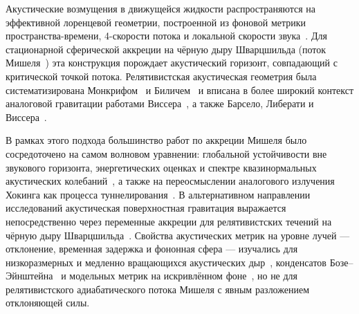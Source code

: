 \documentclass[12pt,a4paper,preprint]{elsarticle}
\begin{document}
        Акустические возмущения в движущейся жидкости распространяются на эффективной лоренцевой геометрии, построенной из фоновой метрики пространства-времени, 4-скорости потока и локальной скорости звука~\cite{UnruhWG_ExperimentalBlackHoleEvaporation_1981, VisserM_AcousticBlackHolesHorizonsErgospheresAndHawkingRadiation_1998, BarceloC_LiberatiS_VisserM_AnalogueGravity_2011}. Для стационарной сферической аккреции на чёрную дыру Шварцшильда (поток Мишеля~\cite{MichelFC_AccretionOfMatterByCondensedObjects_1972}) эта конструкция порождает акустический горизонт, совпадающий с критической точкой потока. Релятивистская акустическая геометрия была систематизирована Монкрифом~\cite{MoncriefV_StabilityOfStationarySphericalAccretionOntoASchwarzschildBlackHole_1980} и Биличем~\cite{BilicN_RelativisticAcousticGeometry_1999} и вписана в более широкий контекст аналоговой гравитации работами Виссера~\cite{VisserM_AcousticBlackHolesHorizonsErgospheresAndHawkingRadiation_1998}, а также Барсело, Либерати и Виссера~\cite{BarceloC_LiberatiS_VisserM_AnalogueGravity_2011}.
        
        В рамках этого подхода большинство работ по аккреции Мишеля было сосредоточено на самом волновом уравнении: глобальной устойчивости вне звукового горизонта, энергетических оценках и спектре квазинормальных акустических колебаний~\cite{MoncriefV_StabilityOfStationarySphericalAccretionOntoASchwarzschildBlackHole_1980, ChaverraE_MoralesMD_SarbachO_QuasinormalAcousticOscillationsInTheMichelFlow_2015}, а также на переосмыслении аналогового излучения Хокинга как процесса туннелирования~\cite{JangidN_RayAK_AcousticHawkingRadiationAsATunnellingEffectInMichelAccretion_2026}. В альтернативном направлении исследований акустическая поверхностная гравитация выражается непосредственно через переменные аккреции для релятивистских течений на чёрную дыру Шварцшильда~\cite{DasTK_BilicN_DasguptaS_BlackHoleAccretionDiscAsAnAnalogueGravityModel_2007, TarafdarP_DasTK_GeometricConfigurationOfMatterForAxiallySymmetricBackgroundFlowsInTheSchwarzschildMetric_2013, ShaikhMA_FirdousiI_DasTK_RelativisticSonicGeometryForIsothermalAccretionInTheSchwarzschildMetric_2017}. Свойства акустических метрик на уровне лучей --- отклонение, временная задержка и фононная сфера --- изучались для низкоразмерных и медленно вращающихся акустических дыр~\cite{ToshmatovB_AhmedovB_StuchlikZ_PhononMotionAround21DimensionalAcousticBlackHole_2023, BalaliAE_MarraniA_LenseThirringAcousticBlackHolesShadowsAndLight_2025}, конденсатов Бозе--Эйнштейна~\cite{VieiraHS_DestounisK_KokkotasKD_AnalogSchwarzschildBlackHolesOfBoseEinsteinCondensatesInACavityQuasinormalModesAndQuasiboundStates_2023} и модельных метрик на искривлённом фоне~\cite{PalK_PalK_SarkarT_AnalogueMetricInABlackBounceBackground_2022}, но не для релятивистского адиабатического потока Мишеля с явным разложением отклоняющей силы.
        
\end{document}
